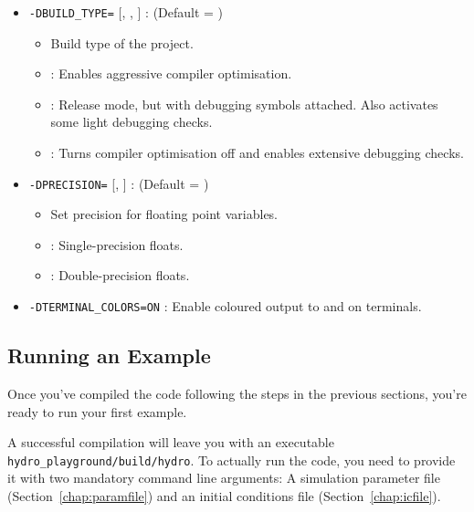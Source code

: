 \begin{itemize}
\item \verb|-DBUILD_TYPE=| [, , ] :
    (Default = )
    \begin{itemize}
        \item Build type of the project.
        \item {}: Enables aggressive compiler optimisation.
        \item {}: Release mode, but with debugging symbols
                attached. Also activates some light debugging checks.
        \item {}: Turns compiler optimisation off and enables
                extensive debugging checks.
    \end{itemize}

\item \verb|-DPRECISION=| [, ] :
    (Default = )
    \begin{itemize}
        \item Set precision for floating point variables.
        \item {}: Single-precision floats.
        \item {}: Double-precision floats.
    \end{itemize}

\item \verb|-DTERMINAL_COLORS=ON| :
    Enable coloured output to  and  on terminals.

\end{itemize}








\subsection{Running an Example}


Once you've compiled the code following the steps in the previous sections,
you're ready to run your first example.

A successful compilation will leave you with an executable
\verb|hydro_playground/build/hydro|. To actually run the code, you need to
provide it with two mandatory command line arguments: A simulation parameter
file (Section~\ref{chap:paramfile}) and an initial conditions file
(Section~\ref{chap:icfile}).

